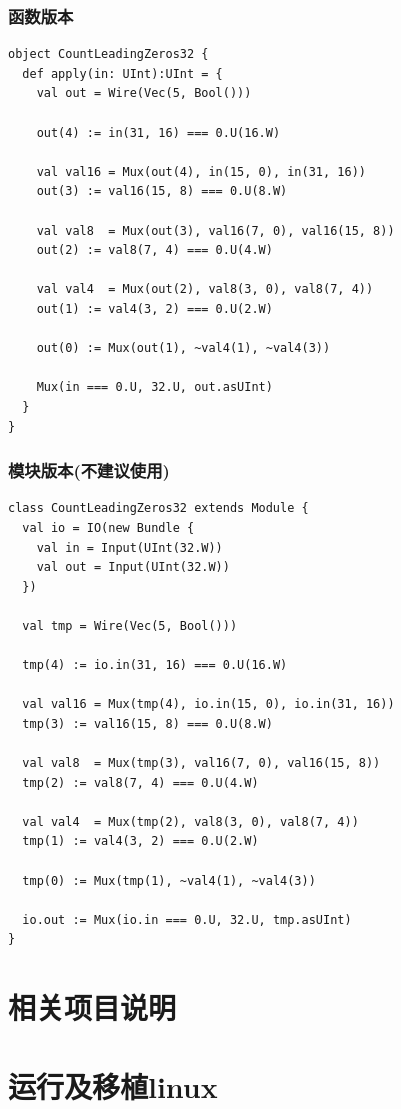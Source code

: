 \documentclass[lang=cn,11pt,a4paper]{elegantpaper}
\begin{document}
\subsubsection{函数版本}

\begin{lstlisting}
object CountLeadingZeros32 {
  def apply(in: UInt):UInt = {
    val out = Wire(Vec(5, Bool()))

    out(4) := in(31, 16) === 0.U(16.W)

    val val16 = Mux(out(4), in(15, 0), in(31, 16))
    out(3) := val16(15, 8) === 0.U(8.W)

    val val8  = Mux(out(3), val16(7, 0), val16(15, 8))
    out(2) := val8(7, 4) === 0.U(4.W)

    val val4  = Mux(out(2), val8(3, 0), val8(7, 4))
    out(1) := val4(3, 2) === 0.U(2.W)

    out(0) := Mux(out(1), ~val4(1), ~val4(3))

    Mux(in === 0.U, 32.U, out.asUInt)
  }
}
\end{lstlisting}

\subsubsection{模块版本(不建议使用)}

\begin{lstlisting}
class CountLeadingZeros32 extends Module {
  val io = IO(new Bundle {
	val in = Input(UInt(32.W))
	val out = Input(UInt(32.W))
  })

  val tmp = Wire(Vec(5, Bool()))

  tmp(4) := io.in(31, 16) === 0.U(16.W)

  val val16 = Mux(tmp(4), io.in(15, 0), io.in(31, 16))
  tmp(3) := val16(15, 8) === 0.U(8.W)

  val val8  = Mux(tmp(3), val16(7, 0), val16(15, 8))
  tmp(2) := val8(7, 4) === 0.U(4.W)

  val val4  = Mux(tmp(2), val8(3, 0), val8(7, 4))
  tmp(1) := val4(3, 2) === 0.U(2.W)

  tmp(0) := Mux(tmp(1), ~val4(1), ~val4(3))

  io.out := Mux(io.in === 0.U, 32.U, tmp.asUInt)
}
\end{lstlisting}

\section{相关项目说明}

\section{运行及移植linux}

\newpage

\nocite{*}
%

\end{document}
